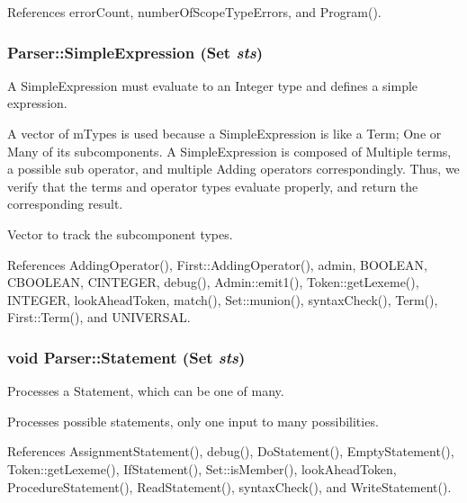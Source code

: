 References errorCount, numberOfScopeTypeErrors, and Program().

\hypertarget{classParser_a9952c751bac78c4e0b3db7be474ed099}{
\subsubsection[{SimpleExpression}]{ Parser::SimpleExpression ({\bf Set} {\em sts})}}
\label{classParser_a9952c751bac78c4e0b3db7be474ed099}


A SimpleExpression must evaluate to an Integer type and defines a simple expression. 

A vector of mTypes is used because a SimpleExpression is like a Term; One or Many of its subcomponents. A SimpleExpression is composed of Multiple terms, a possible sub operator, and multiple Adding operators correspondingly. Thus, we verify that the terms and operator types evaluate properly, and return the corresponding result. 

Vector to track the subcomponent types. 



References AddingOperator(), First::AddingOperator(), admin, BOOLEAN, CBOOLEAN, CINTEGER, debug(), Admin::emit1(), Token::getLexeme(), INTEGER, lookAheadToken, match(), Set::munion(), syntaxCheck(), Term(), First::Term(), and UNIVERSAL.

\hypertarget{classParser_a23d5c23531d92c7249034a9e637b4467}{
\subsubsection[{Statement}]{\setlength{\rightskip}{0pt plus 5cm}void Parser::Statement ({\bf Set} {\em sts})}}
\label{classParser_a23d5c23531d92c7249034a9e637b4467}


Processes a Statement, which can be one of many. 

Processes possible statements, only one input to many possibilities. 

References AssignmentStatement(), debug(), DoStatement(), EmptyStatement(), Token::getLexeme(), IfStatement(), Set::isMember(), lookAheadToken, ProcedureStatement(), ReadStatement(), syntaxCheck(), and WriteStatement().

